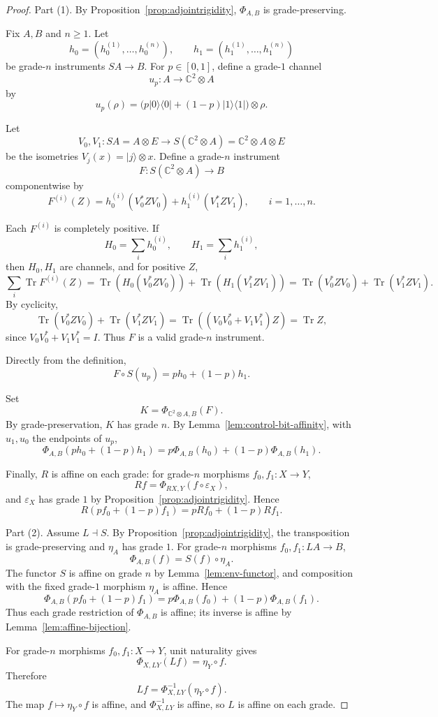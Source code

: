 \documentclass[11pt]{article}
\DeclareMathOperator{\Tr}{Tr}
\begin{document}
\begin{proof}
Part (1). By Proposition~\ref{prop:adjointrigidity}, $\Phi_{A,B}$ is
grade-preserving.

Fix $A,B$ and $n\ge1$. Let
\[
h_0=(h_0^{(1)},\dots,h_0^{(n)}),
\qquad
h_1=(h_1^{(1)},\dots,h_1^{(n)})
\]
be grade-$n$ instruments $SA\to B$. For $p\in[0,1]$, define a grade-$1$
channel
\[
u_p:A\to\mathbb C^2\otimes A
\]
by
\[
u_p(\rho)=
\bigl(p|0\rangle\langle0|+(1-p)|1\rangle\langle1|\bigr)\otimes\rho.
\]

Let
\[
V_0,V_1:SA=A\otimes E\longrightarrow S(\mathbb C^2\otimes A)
=\mathbb C^2\otimes A\otimes E
\]
be the isometries $V_j(x)=|j\rangle\otimes x$. Define a grade-$n$
instrument
\[
F:S(\mathbb C^2\otimes A)\longrightarrow B
\]
componentwise by
\[
F^{(i)}(Z)
=
h_0^{(i)}(V_0^*ZV_0)+h_1^{(i)}(V_1^*ZV_1),
\qquad i=1,\dots,n.
\]

Each $F^{(i)}$ is completely positive. If
\[
H_0=\sum_i h_0^{(i)},
\qquad
H_1=\sum_i h_1^{(i)},
\]
then $H_0,H_1$ are channels, and for positive $Z$,
\[
\sum_i\Tr F^{(i)}(Z)
=
\Tr(H_0(V_0^*ZV_0))+\Tr(H_1(V_1^*ZV_1))
=
\Tr(V_0^*ZV_0)+\Tr(V_1^*ZV_1).
\]
By cyclicity,
\[
\Tr(V_0^*ZV_0)+\Tr(V_1^*ZV_1)
=
\Tr((V_0V_0^*+V_1V_1^*)Z)
=
\Tr Z,
\]
since $V_0V_0^*+V_1V_1^*=I$. Thus $F$ is a valid grade-$n$ instrument.

Directly from the definition,
\[
F\circ S(u_p)=ph_0+(1-p)h_1.
\]

Set
\[
K=\Phi_{\mathbb C^2\otimes A,B}(F).
\]
By grade-preservation, $K$ has grade $n$. By
Lemma~\ref{lem:control-bit-affinity}, with $u_1,u_0$ the endpoints of
$u_p$,
\[
\Phi_{A,B}(ph_0+(1-p)h_1)
=
p\Phi_{A,B}(h_0)+(1-p)\Phi_{A,B}(h_1).
\]

Finally, $R$ is affine on each grade: for grade-$n$ morphisms
$f_0,f_1:X\to Y$,
\[
Rf=\Phi_{RX,Y}(f\circ\varepsilon_X),
\]
and $\varepsilon_X$ has grade $1$ by
Proposition~\ref{prop:adjointrigidity}. Hence
\[
R(pf_0+(1-p)f_1)=pRf_0+(1-p)Rf_1.
\]

Part (2). Assume $L\dashv S$. By Proposition~\ref{prop:adjointrigidity},
the transposition is grade-preserving and $\eta_A$ has grade $1$. For
grade-$n$ morphisms $f_0,f_1:LA\to B$,
\[
\Phi_{A,B}(f)=S(f)\circ\eta_A.
\]
The functor $S$ is affine on grade $n$ by Lemma~\ref{lem:env-functor}, and
composition with the fixed grade-$1$ morphism $\eta_A$ is affine. Hence
\[
\Phi_{A,B}(pf_0+(1-p)f_1)
=
p\Phi_{A,B}(f_0)+(1-p)\Phi_{A,B}(f_1).
\]
Thus each grade restriction of $\Phi_{A,B}$ is affine; its inverse is
affine by Lemma~\ref{lem:affine-bijection}.

For grade-$n$ morphisms $f_0,f_1:X\to Y$, unit naturality gives
\[
\Phi_{X,LY}(Lf)=\eta_Y\circ f.
\]
Therefore
\[
Lf=\Phi_{X,LY}^{-1}(\eta_Y\circ f).
\]
The map $f\mapsto\eta_Y\circ f$ is affine, and $\Phi_{X,LY}^{-1}$ is
affine, so $L$ is affine on each grade.
\end{proof}
\end{document}
